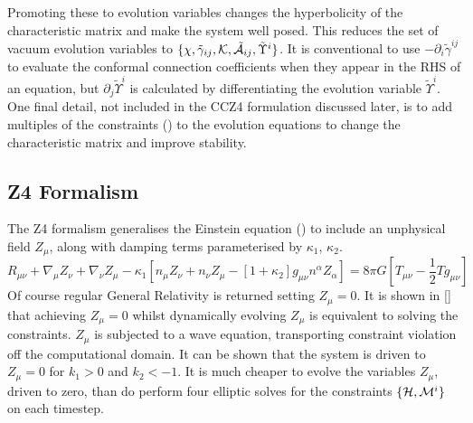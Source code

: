 Promoting these to evolution variables changes the hyperbolicity of the characteristic matrix and make the system well posed. This reduces the set of vacuum evolution variables to $\{\chi,\tilde{\gamma}_{ij},\mathcal{K},\tilde{\mathcal{A}}_{ij},\tilde{\Upsilon}^i \}$. It is conventional to use $-\partial_i \tilde{\gamma}^{ij}$ to evaluate the conformal connection coefficients when they appear in the RHS of an equation, but $\partial_j \tilde{\Upsilon}^i$ is calculated by differentiating the evolution variable $\tilde{\Upsilon}^i$. One final detail, not included in the CCZ4 formulation discussed later, is to add multiples of the constraints () to the evolution equations to change the characteristic matrix and improve stability.


\subsection{Z4 Formalism}
The Z4 formalism \cite{z4} generalises the Einstein equation () to include an unphysical field $Z_\mu$, along with damping terms parameterised by $\kappa_1$, $\kappa_2$. 
\begin{equation} R_{\mu\nu} + \nabla_\mu Z_\nu + \nabla_\nu Z_\mu - \kappa_1\left[ n_\mu Z_\nu + n_\nu Z_\mu - [1+\kappa_2]g_{\mu\nu}n^\alpha Z_\alpha\right] = 8\pi G \left[T_{\mu\nu}- \frac{1}{2}Tg_{\mu\nu} \right]\end{equation}
Of course regular General Relativity is returned setting $Z_\mu=0$. It is shown in [] that achieving $Z_\mu=0$ whilst dynamically evolving $Z_\mu$  is equivalent to solving the constraints. $Z_\mu$ is subjected to a wave equation, transporting constraint violation off the computational domain. It can be shown that the system is driven to $Z_\mu =0$ for $k_1>0$ and $k_2<-1$. It is much cheaper to evolve the variables $Z_\mu$, driven to zero, than do perform four elliptic solves for the constraints $\{\mathcal{H},\mathcal{M}^i\}$ on each timestep. 

